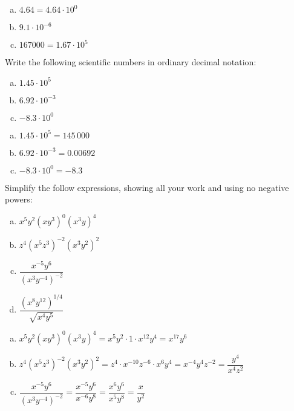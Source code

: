 \documentclass[12pt,letterpaper]{exam}
\begin{document}
\begin{questions}
\begin{enumerate}[(a)]
\item $4.64= 4.64 \cdot 10^0$ \pspace

\item $9.1 \cdot 10^{-6}$ \pspace

\item $167000= 1.67 \cdot 10^5$
\end{enumerate}



\newpage
\question[10] Write the following scientific numbers in ordinary decimal notation:
	\begin{enumerate}[(a)]
	\item $1.45 \cdot 10^5$ 
	\item $6.92 \cdot 10^{-3}$
	\item $-8.3 \cdot 10^0$
	\end{enumerate} \pspace

\sol
\begin{enumerate}[(a)]
\item $1.45 \cdot 10^5= 145\,000$ \pspace

\item $6.92 \cdot 10^{-3}= 0.00692$ \pspace

\item $-8.3 \cdot 10^0= -8.3$
\end{enumerate}



\newpage
\question[10] Simplify the follow expressions, showing all your work and using no negative powers:
	\begin{enumerate}[(a)] \itemsep=0.3cm
	\item $x^5 y^2 (xy^3)^0 (x^3y)^4$
	\item $z^4(x^5 z^3)^{-2} (x^3 y^2)^2$
	\item $\dfrac{x^{-5} y^6}{(x^3 y^{-4})^{-2}}$
	\item $\dfrac{(x^8 y^{12})^{1/4}}{\sqrt{x^4 y^5}}$
	\end{enumerate} \pspace

\sol
\begin{enumerate}[(a)]
\item $x^5 y^2 (xy^3)^0 (x^3y)^4= x^5 y^2 \cdot 1 \cdot x^{12} y^4= x^{17} y^6$ \pspace

\item $z^4(x^5 z^3)^{-2} (x^3 y^2)^2= z^4 \cdot x^{-10} z^{-6} \cdot x^6 y^4= x^{-4} y^4 z^{-2}= \dfrac{y^4}{x^4 z^2}$ \pspace

\item $\dfrac{x^{-5} y^6}{(x^3 y^{-4})^{-2}}= \dfrac{x^{-5} y^6}{x^{-6} y^8}= \dfrac{x^6 y^6}{x^5 y^8}= \dfrac{x}{y^2}$ \pspace


\end{enumerate}
\end{questions}
\end{document}
